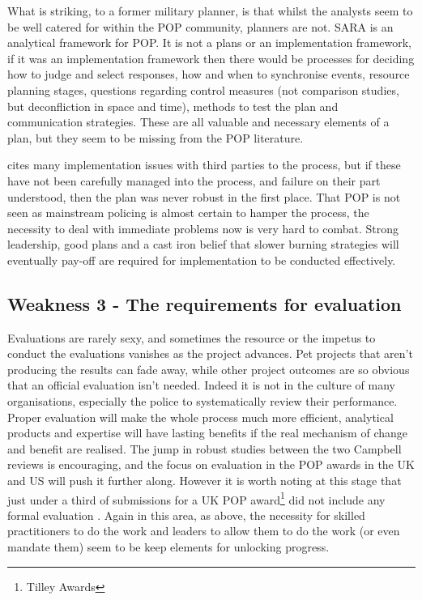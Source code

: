 What is striking, to a former military planner, is that whilst the analysts seem to be well catered for within the POP community, planners are not. SARA is an analytical framework for POP. It is not a plans or an implementation framework, if it was an implementation framework then there would be processes for deciding how to judge and select responses, how and when to synchronise events, resource planning stages, questions regarding control measures (not comparison studies, but deconfliction in space and time), methods to test the plan and communication strategies. These are all valuable and necessary elements of a plan, but they seem to be missing from the POP literature.  

\parencite{hinkle2020problem} cites many implementation issues with third parties to the process, but if these have not been carefully managed into the process, and failure on their part understood, then the plan was never robust in the first place. That POP is not seen as mainstream policing is almost certain to hamper the process, the necessity to deal with immediate problems now is very hard to combat. Strong leadership, good plans and a cast iron belief that slower burning strategies will eventually pay-off  are required for implementation to be conducted effectively. 

 
 \subsection{Weakness 3 - The requirements for evaluation}



Evaluations are rarely sexy, and sometimes the resource or the impetus to conduct the evaluations vanishes as the project advances. Pet projects that aren't producing the results can fade away, while other project outcomes are so obvious that an official evaluation isn't needed. Indeed it is not in the culture of many organisations, especially the police to systematically review their performance\parencite{goldstein1990}. Proper evaluation will make the whole process much more efficient, analytical products and expertise will have lasting benefits if the real mechanism of change and benefit are realised. The jump in robust studies between the two Campbell reviews is encouraging, and the focus on evaluation in the POP awards in the UK and US will push it further along.  However it is worth noting at this stage that just under a third of submissions for a UK POP award\footnote{Tilley Awards} did not include any formal evaluation \parencite{POPUCL}. Again in this area, as above,  the necessity for skilled practitioners to do the work and leaders to allow them to do the work (or even mandate them) seem to be keep elements for unlocking progress.  



